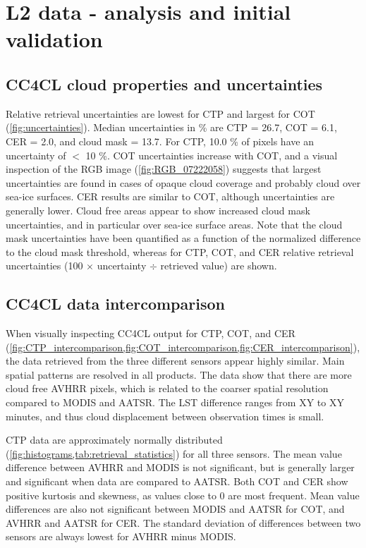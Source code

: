 \section{L2 data - analysis and initial validation}\label{L2_data}

\subsection{CC4CL cloud properties and uncertainties}

Relative retrieval uncertainties are lowest for CTP and largest for COT (\cref{fig:uncertainties}). Median uncertainties in \% are CTP = 26.7, COT = 6.1, CER = 2.0, and cloud mask = 13.7. For CTP, 10.0 \% of pixels have an uncertainty of $<$ 10 \%. COT uncertainties increase with COT, and a visual inspection of the RGB image (\cref{fig:RGB_07222058}) suggests that largest uncertainties are found in cases of opaque cloud coverage and probably cloud over sea-ice surfaces. CER results are similar to COT, although uncertainties are generally lower. Cloud free areas appear to show increased cloud mask uncertainties, and in particular over sea-ice surface areas. Note that the cloud mask uncertainties have been quantified as a function of the normalized difference to the cloud mask threshold, whereas for CTP, COT, and CER relative retrieval uncertainties (100 $\times$ uncertainty $\div$ retrieved value) are shown. 

\subsection{CC4CL data intercomparison}

When visually inspecting CC4CL output for CTP, COT, and CER (\cref{fig:CTP_intercomparison,fig:COT_intercomparison,fig:CER_intercomparison}), the data retrieved from the three different sensors appear highly similar. Main spatial patterns are resolved in all products. The data show that there are more cloud free AVHRR pixels, which is related to the coarser spatial resolution compared to MODIS and AATSR. The LST difference ranges from XY to XY minutes, and thus cloud displacement between observation times is small.

CTP data are approximately normally distributed (\cref{fig:histograms,tab:retrieval_statistics}) for all three sensors. The mean value difference between AVHRR and MODIS is not significant, but is generally larger and significant when data are compared to AATSR. Both COT and CER show positive kurtosis and skewness, as values close to 0 are most frequent. Mean value differences are also not significant between MODIS and AATSR for COT, and AVHRR and AATSR for CER. The standard deviation of differences between two sensors are always lowest for AVHRR minus MODIS.

